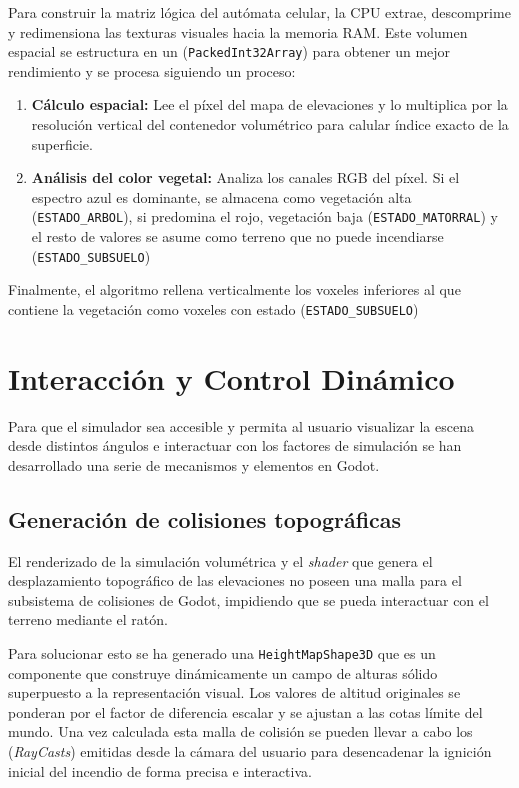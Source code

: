         Para construir la matriz lógica del autómata celular, la CPU extrae, descomprime y redimensiona las texturas visuales hacia la memoria RAM. Este volumen espacial se estructura en un (\texttt{PackedInt32Array}) para obtener un mejor rendimiento y se procesa siguiendo un proceso:
        \begin{enumerate}
            \item \textbf{Cálculo espacial:} Lee el píxel del mapa de elevaciones y lo multiplica por la resolución vertical del contenedor volumétrico para calular índice exacto de la superficie.
            \item \textbf{Análisis del color vegetal:} Analiza los canales RGB del píxel. Si el espectro azul es dominante, se almacena como vegetación alta (\texttt{ESTADO\_ARBOL}), si predomina el rojo, vegetación baja (\texttt{ESTADO\_MATORRAL}) y el resto de valores se asume como terreno que no puede incendiarse (\texttt{ESTADO\_SUBSUELO})
        \end{enumerate}

        Finalmente, el algoritmo rellena verticalmente los voxeles inferiores al que contiene la vegetación como voxeles con estado (\texttt{ESTADO\_SUBSUELO})


\section{Interacción y Control Dinámico}
Para que el simulador sea accesible y permita al usuario visualizar la escena desde distintos ángulos e interactuar con los factores de simulación se han desarrollado una serie de mecanismos y elementos en Godot.
 
    \subsection[Generación de colisiones]{Generación de colisiones topográficas}

        El renderizado de la simulación volumétrica y el \textit{shader} que genera el desplazamiento topográfico de las elevaciones no poseen una malla para el subsistema de colisiones de Godot, impidiendo que se pueda interactuar con el terreno mediante el ratón.
        
        Para solucionar esto se ha generado una  \texttt{HeightMapShape3D} que es un  componente que construye dinámicamente un campo de alturas sólido superpuesto a la representación visual. Los valores de altitud originales se ponderan por el factor de diferencia escalar y se ajustan a las cotas límite del mundo. Una vez calculada esta malla de colisión  se pueden llevar a cabo los (\textit{RayCasts}) emitidas desde la cámara del usuario para desencadenar la ignición inicial del incendio de forma precisa e interactiva.
    
